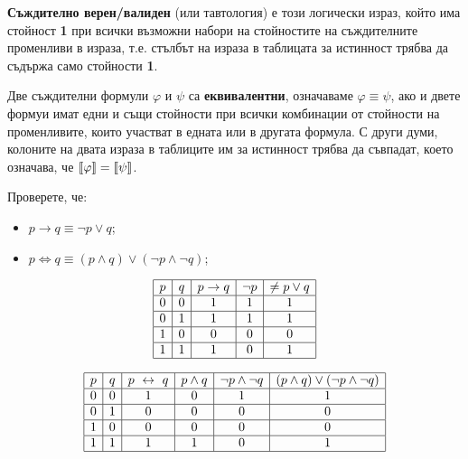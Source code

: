 {\bf Съждително верен/валиден} (или тавтология) е този логически израз, който има стойност {\bf 1} при всички възможни набори на
стойностите на съждителните променливи в израза, т.е. стълбът на израза в таблицата за истинност трябва да съдържа само 
стойности {\bf 1}. 

Две съждителни формули $\varphi$ и $\psi$ са {\bf еквивалентни}, означаваме $\varphi \equiv \psi$, ако 
и двете формуи имат едни и същи стойности при всички комбинации от стойности на променливите, които участват в едната или в другата формула.
С други думи, колоните на двата израза в таблиците им за истинност трябва да съвпадат, което означава, че $\val{\varphi} = \val{\psi}$.

\begin{problem}
  Проверете, че:
  \begin{itemize}
  \item 
    $p\to q \equiv \neg p \lor q$;
  \item
    $p \iff q \equiv (p \land q) \vee (\neg p \land \neg q)$;
  \end{itemize}
\end{problem}
\begin{solution}
\[
  \begin{array}{|c|c|c|c|c|}
    \hline
    p & q & p \to q & \neg p & \neq p \lor q \\
    \hline
    0 & 0 & 1 & 1 & 1\\
    \hline
    0 & 1 & 1 & 1 & 1\\
    \hline
    1 & 0 & 0 & 0 & 0\\
    \hline
    1 & 1 & 1 & 0 & 1\\
    \hline
  \end{array}
  \]  


\[
  \begin{array}{|c|c|c|c|c|c|}
    \hline
    p & q & p \iff q & p \land q & \neg p \land \neg q & (p \land q) \lor (\neg p \land \neg q)\\
    \hline
    0 & 0 & 1 & 0 & 1 & 1\\
    \hline
    0 & 1 & 0 & 0 & 0 & 0\\
    \hline
    1 & 0 & 0 & 0 & 0 & 0\\
    \hline
    1 & 1 & 1 & 1 & 0 & 1\\
    \hline
  \end{array}
  \]  
\end{solution}


